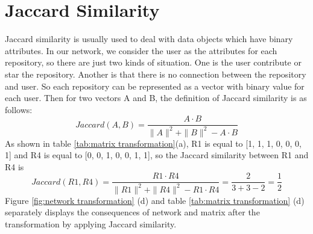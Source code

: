 \documentclass[12pt,oneside,final]{vlsithesis}
\begin{document}
\section{Jaccard Similarity}
Jaccard similarity \cite{strehl2000impact} is usually used to deal with data objects which have binary attributes. In our network, we consider the user as the attributes for each repository, so there are just two kinds of situation. One is the user contribute or star the repository. Another is that there is no connection between the repository and user. So each repository can be represented as a vector with binary value for each user. Then for two vectors A and B, the definition of Jaccard similarity is as follows:
\begin{equation*}
Jaccard(A,B) = \dfrac{A \cdot B}{\parallel A \parallel^{2} + \parallel B \parallel^{2} - A \cdot B}
\end{equation*}
As shown in table \ref{tab:matrix transformation}(a), R1 is equal to  [1, 1, 1, 0, 0, 0, 1] and R4 is equal to [0, 0, 1, 0, 0, 1, 1], so the Jaccard similarity between R1 and R4 is
\begin{equation*} 
Jaccard(R1,R4) = \dfrac{R1 \cdot R4}{\parallel R1 \parallel^{2} + \parallel R4 \parallel^{2} - R1 \cdot R4} = \frac{2}{3 + 3 -2} = \frac{1}{2} 
\end{equation*}
Figure \ref{fig:network transformation} (d) and table \ref{tab:matrix transformation} (d) separately displays the consequences of network and matrix after the transformation by applying Jaccard similarity.
\end{document}
